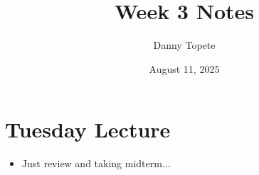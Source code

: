 \documentclass{article}
\title{Week 3 Notes}
\author{Danny Topete}
\date{August 11, 2025}
\begin{document}
\maketitle
\section{Tuesday Lecture}
\begin{itemize}
  \item Just review and taking midterm...
\end{itemize}
\end{document}
